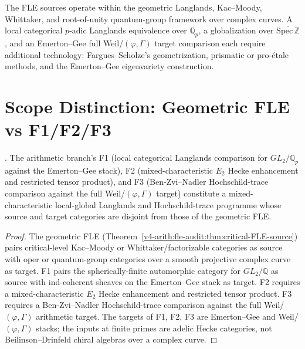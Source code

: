 \begin{remark}
\label{v4-arith:fle-audit:rem:source-boundary}
The FLE sources operate within the geometric Langlands, Kac--Moody,
Whittaker, and root-of-unity quantum-group framework over complex
curves. A local categorical \(p\)-adic Langlands equivalence over
\(\mathbb{Q}_{p}\), a globalization over
\(\overline{\mathrm{Spec}\,\mathbb{Z}}\), and an Emerton--Gee full
Weil/\((\varphi,\Gamma)\) target comparison each require additional
technology: Fargues--Scholze's geometrization, prismatic or
pro-\'etale methods, and the Emerton--Gee eigenvariety construction.
\end{remark}

\section{Scope Distinction: Geometric FLE vs F1/F2/F3}
\label{v4-arith:fle-audit:non-identification}

\begin{proposition}
\label{v4-arith:fle-audit:prop:not-FLE}
\ClaimStatusNeedsVerification. The arithmetic branch's F1 (local
categorical Langlands comparison for \(GL_{2}/\mathbb{Q}_{p}\) against
the Emerton--Gee stack), F2 (mixed-characteristic \(E_{2}\) Hecke
enhancement and restricted tensor product), and F3 (Ben-Zvi--Nadler
Hochschild-trace comparison against the full Weil/\((\varphi,\Gamma)\)
target) constitute a mixed-characteristic local-global Langlands and
Hochschild-trace programme whose source and target categories are
disjoint from those of the geometric FLE.
\end{proposition}

\begin{proof}
The geometric FLE (Theorem~\ref{v4-arith:fle-audit:thm:critical-FLE-source})
pairs critical-level Kac--Moody or Whittaker/factorizable categories
as source with oper or quantum-group categories over a smooth
projective complex curve as target. F1 pairs the spherically-finite
automorphic category for \(GL_{2}/\mathbb{Q}\) as source with
ind-coherent sheaves on the Emerton--Gee stack as target. F2 requires
a mixed-characteristic \(E_{2}\) Hecke enhancement and restricted
tensor product. F3 requires a Ben-Zvi--Nadler Hochschild-trace
comparison against the full Weil/\((\varphi,\Gamma)\) arithmetic
target. The targets of F1, F2, F3 are Emerton--Gee and
Weil/\((\varphi,\Gamma)\) stacks; the inputs at finite primes are
adelic Hecke categories, not Beilinson--Drinfeld chiral algebras over
a complex curve.
\end{proof}

